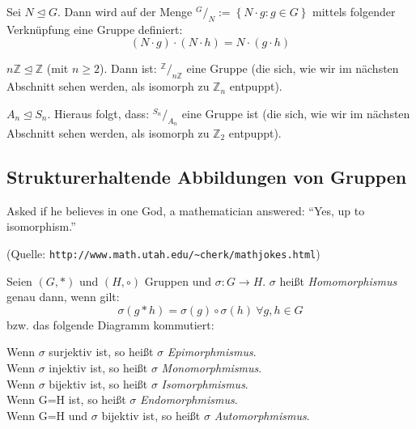 \documentclass[10pt]{scrbook}
\begin{document}
\begin{Sa}
Sei $N\trianglelefteq G$. Dann wird auf der Menge $^G/_N:=\left\{N\cdot g: g\in G\right\}$ mittels folgender Verknüpfung eine Gruppe definiert:
\begin{displaymath}
	(N\cdot g)\cdot (N\cdot h)=N\cdot(g\cdot h)
\end{displaymath}
\end{Sa}

\begin{Bsp}
$n \mathbb{Z}\trianglelefteq \mathbb{Z}$ (mit $n\geq 2$). Dann ist: $^\mathbb{Z}/_{n \mathbb{Z}}$ eine Gruppe (die sich, wie wir im nächsten Abschnitt sehen werden, als isomorph zu $\mathbb{Z}_n$ entpuppt).
\end{Bsp}

\begin{Bsp}
$A_n \trianglelefteq S_n$. Hieraus folgt, dass: $^{S_n}/_{A_n}$ eine Gruppe ist (die sich, wie wir im nächsten Abschnitt sehen werden, als isomorph zu $\mathbb{Z}_2$ entpuppt).
\end{Bsp}

\subsection{Strukturerhaltende Abbildungen von Gruppen}

Asked if he believes in one God, a mathematician answered:
"`Yes, up to isomorphism."'

(Quelle: \verb|http://www.math.utah.edu/~cherk/mathjokes.html|)

\begin{Def}
Seien $(G, *)$ und $(H, \circ)$ Gruppen und $\sigma: G\rightarrow H$. $\sigma$ heißt \emph{Homomorphismus} genau dann, wenn gilt:
\begin{equation}
	\sigma(g*h)=\sigma(g)\circ\sigma(h)\ \forall g, h\in G
	\label{eq:homomorphismus}
\end{equation}
bzw. das folgende Diagramm kommutiert:

\begin{xy}
\end{xy}
\end{Def}

\begin{Def}
Wenn $\sigma$ surjektiv ist, so heißt $\sigma$ \emph{Epimorphmismus}.\\
Wenn $\sigma$ injektiv ist, so heißt $\sigma$ \emph{Monomorphmismus}.\\
Wenn $\sigma$ bijektiv ist, so heißt $\sigma$ \emph{Isomorphmismus}.\\
Wenn G=H ist, so heißt $\sigma$ \emph{Endomorphmismus}.\\
Wenn G=H und $\sigma$ bijektiv ist, so heißt $\sigma$ \emph{Automorphmismus}.
\end{Def}
\end{document}
